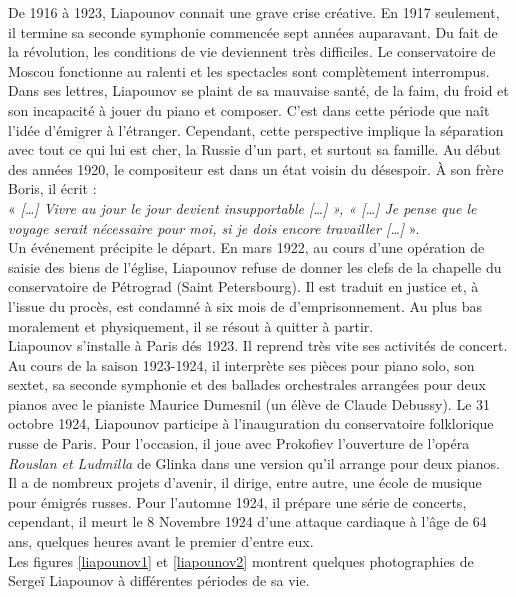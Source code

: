De 1916 à 1923, Liapounov connait une grave crise créative. En 1917 seulement, il termine sa seconde symphonie commencée sept années auparavant. Du fait de la révolution, les conditions de vie deviennent très difficiles. Le conservatoire de Moscou fonctionne au ralenti et les spectacles sont complètement interrompus. Dans ses lettres, Liapounov se plaint de sa mauvaise santé, de la faim, du froid et son incapacité à jouer du piano et composer. C'est dans cette période que naît l'idée d'émigrer à l'étranger. Cependant, cette perspective implique la séparation avec tout ce qui lui est cher, la Russie d'un part, et surtout sa famille. Au début des années 1920, le compositeur est dans un état voisin du désespoir. À son frère Boris, il écrit :\\
« \emph{[\dots] Vivre au jour le jour devient insupportable [\dots] », « [\dots] Je pense que le voyage serait nécessaire pour moi, si je dois encore travailler [\dots]} ».\\

Un événement précipite le départ. En mars 1922, au cours d'une opération de saisie des biens de l'église, Liapounov refuse de donner les clefs de la chapelle du conservatoire de Pétrograd (Saint Petersbourg). Il est traduit en justice et, à l'issue du procès, est condamné à six mois de d'emprisonnement. Au plus bas moralement et physiquement, il se résout à quitter à partir.\\

Liapounov s'installe à Paris dés 1923. Il reprend très vite ses activités de concert. Au cours de la saison 1923-1924, il interprète ses pièces pour piano solo, son sextet, sa seconde symphonie et des ballades orchestrales arrangées pour deux pianos avec le pianiste Maurice Dumesnil (un élève de Claude Debussy). Le 31 octobre 1924, Liapounov participe à l'inauguration du conservatoire folklorique russe de Paris. Pour l'occasion, il joue avec Prokofiev l'ouverture de l'opéra \emph{Rouslan et Ludmilla} de Glinka dans une version qu'il arrange pour deux pianos. Il a de nombreux projets d'avenir, il dirige, entre autre, une école de musique pour émigrés russes. Pour l'automne 1924, il prépare une série de concerts, cependant, il meurt le 8 Novembre 1924 d'une attaque cardiaque à l'âge de 64 ans, quelques heures avant le premier d'entre eux.\\

Les figures \ref{liapounov1} et \ref{liapounov2} montrent quelques photographies de Sergeï Liapounov à différentes périodes de sa vie.

